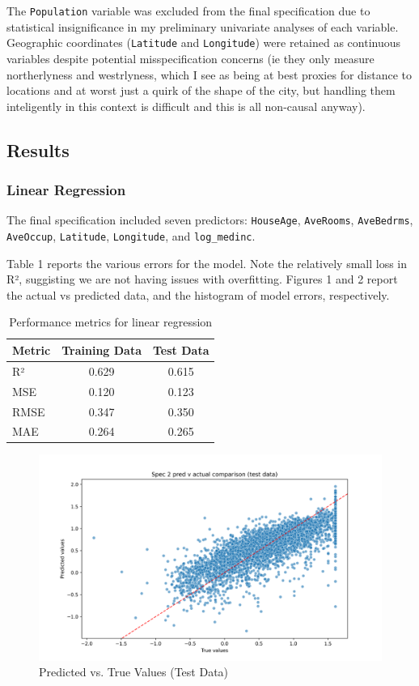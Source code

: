 \documentclass[letterpaper, 11pt]{amsart}
\begin{document}
The \texttt{Population} variable was excluded from the final specification due to statistical insignificance in my preliminary univariate analyses of each variable. Geographic coordinates (\texttt{Latitude} and \texttt{Longitude}) were retained as continuous variables despite potential misspecification concerns (ie they only measure northerlyness and westrlyness, which I see as being at best proxies for distance to locations and at worst just a quirk of the shape of the city, but handling them inteligently in this context is difficult and this is all non-causal anyway).

\subsection{Results}

\subsubsection{Linear Regression}
The final specification included seven predictors: \texttt{HouseAge}, \texttt{AveRooms}, \texttt{AveBedrms}, \texttt{AveOccup}, \texttt{Latitude}, \texttt{Longitude}, and \texttt{log\_medinc}.

Table 1 reports the various errors for the model. Note the relatively small loss in R², suggisting we are not having issues with overfitting. Figures 1 and 2 report the actual vs predicted data, and the histogram of model errors, respectively.

\begin{table}[h]
\centering
\begin{tabular}{lcc}
\hline
Metric & Training Data & Test Data \\
\hline
R² & 0.629 & 0.615 \\
MSE & 0.120 & 0.123 \\
RMSE & 0.347 & 0.350 \\
MAE & 0.264 & 0.265 \\
\hline
\end{tabular}
\caption{Performance metrics for linear regression}
\end{table}

\begin{figure}[h]
\centering
\includegraphics[width=0.8\linewidth]{plots/Spec_2_pred_v_actual_test.png}
\caption{Predicted vs. True Values (Test Data)}
\end{figure}
\end{document}
